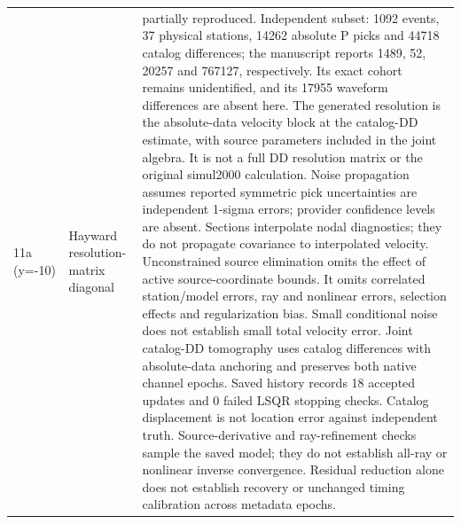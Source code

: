 \begin{longtable}{>{\raggedright\arraybackslash}p{}>{\raggedright\arraybackslash}p{}>{\raggedright\arraybackslash}p{}}
11a (y=-10) & Hayward resolution-matrix diagonal & partially reproduced. Independent subset: 1092 events, 37 physical stations, 14262 absolute P picks and 44718 catalog differences; the manuscript reports 1489, 52, 20257 and 767127, respectively. Its exact cohort remains unidentified, and its 17955 waveform differences are absent here. The generated resolution is the absolute-data velocity block at the catalog-DD estimate, with source parameters included in the joint algebra. It is not a full DD resolution matrix or the original simul2000 calculation. Noise propagation assumes reported symmetric pick uncertainties are independent 1-sigma errors; provider confidence levels are absent. Sections interpolate nodal diagnostics; they do not propagate covariance to interpolated velocity. Unconstrained source elimination omits the effect of active source-coordinate bounds. It omits correlated station/model errors, ray and nonlinear errors, selection effects and regularization bias. Small conditional noise does not establish small total velocity error. Joint catalog-DD tomography uses catalog differences with absolute-data anchoring and preserves both native channel epochs. Saved history records 18 accepted updates and 0 failed LSQR stopping checks. Catalog displacement is not location error against independent truth. Source-derivative and ray-refinement checks sample the saved model; they do not establish all-ray or nonlinear inverse convergence. Residual reduction alone does not establish recovery or unchanged timing calibration across metadata epochs.\\

\end{longtable}
